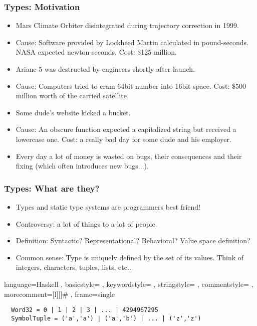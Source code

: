 \documentclass[11pt]{beamer}
\begin{document}
	\begin{frame}
		\frametitle{Types: Motivation}
			\begin{itemize}[<+->]
				\item Mars Climate Orbiter disintegrated during trajectory correction in 1999.
				\item Cause: Software provided by Lockheed Martin calculated in pound-seconds. NASA expected newton-seconds. Cost: \$125 million.
				\item Ariane 5 was destructed by engineers shortly after launch.
				\item Cause: Computers tried to cram 64bit number into 16bit space. Cost: \$500 million worth of the carried satellite.
				\item Some dude's website kicked a bucket.
				\item Cause: An obscure function expected a capitalized string but received a lowercase one. Cost: a really bad day for some dude and his employer.
				\item Every day a lot of money is wasted on bugs, their consequences and their fixing (which often introduces new bugs...).
			\end{itemize}
	\end{frame}

\begin{frame}[fragile]
	\frametitle{Types: What are they?}
	\begin{itemize}[<+->]
		\item Types and static type systems are programmers best friend!
		\item Controversy: a lot of things to a lot of people. 
		\item Definition: Syntactic? Representational? Behavioral? Value space definition?
		\item Common sense: Type is uniquely defined by the set of its values. Think of integers, characters, tuples, lists, etc...
	\end{itemize}
\lstset
{ language=Haskell
	, basicstyle=\ttfamily\footnotesize
	, keywordstyle=\color{blue}\ttfamily
	, stringstyle=\color{red}\ttfamily
	, commentstyle=\color{green}\ttfamily
	, morecomment=[l][\color{magenta}]{\#}
	, frame=single
}
\begin{lstlisting}
  Word32 = 0 | 1 | 2 | 3 | ... | 4294967295
  SymbolTuple = ('a','a') | ('a','b') | ... | ('z','z')
\end{lstlisting}	
\end{frame}
\end{document}
